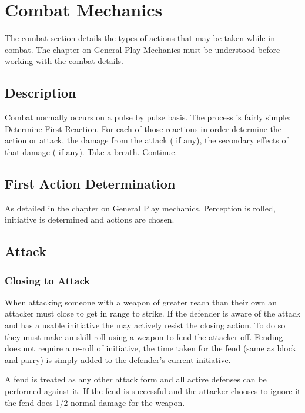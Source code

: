 \chapter{Combat Mechanics}

The combat section details the types of actions that may be taken
while in combat. The chapter on General Play Mechanics must be
understood before working with the combat details.

\section{Description}

Combat normally occurs on a pulse by pulse basis. The process is
fairly simple: Determine First Reaction. For each of those reactions in
order determine the action or attack, the damage from the attack ( if
any), the secondary effects of that damage ( if any). Take a breath.
Continue.

\section{First Action Determination}

As detailed in the chapter on General Play mechanics. Perception
is rolled, initiative is determined and actions are chosen.

\section{Attack}

\subsection{Closing to Attack}

When attacking someone with a weapon of greater reach than their own an
attacker must close to get in range to strike. If the defender is aware
of the attack and has a usable initiative the may actively resist the
closing action. To do so they must make an skill roll using a weapon to
fend the attacker off. Fending does not require a re-roll of initiative,
the time taken for the fend (same as block and parry) is simply added to
the defender's current initiative.

A fend is treated as any other attack form and all active defenses can be
performed against it. If the fend is successful and the attacker chooses
to ignore it the fend does 1/2 normal damage for the weapon.

